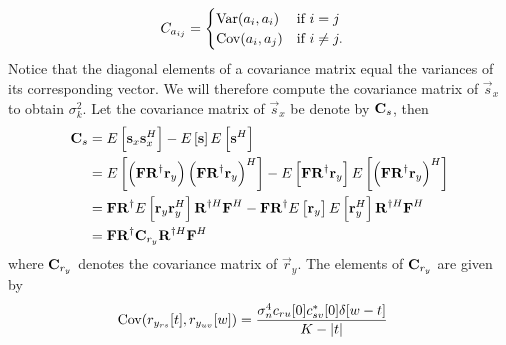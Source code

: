 \documentclass[a4paper, openany, oneside]{memoir}
\begin{document}
\begin{align}\label{eq:elem_cov_mat}
C_{a_{ij}}&= \begin{cases}
\operatorname{Var}(a_i, a_i) & \text{if } i=j\\
\operatorname{Cov} (a_i, a_j) & \text{if } i\neq j.
\end{cases}
\end{align}
Notice that the diagonal elements of a covariance matrix equal the variances of its corresponding vector. We will therefore compute the covariance matrix of $\vec{s}_x$ to obtain $\sigma_k^2$. Let the covariance matrix of $\vec{s}_x$ be denote by $\boldsymbol{\mathbf{C}}_s$, then
\begin{align*}
\boldsymbol{\mathbf{C}}_{s} &= E\left[\boldsymbol{\mathbf{s}}_x\boldsymbol{\mathbf{s}}_x^H\right] - E\left[\boldsymbol{\mathbf{s}}\right]E\left[\boldsymbol{\mathbf{s}}^H\right] \\
&= E\left[\left(\boldsymbol{\mathbf{F}} \boldsymbol{\mathbf{R}}^{\dagger}\boldsymbol{\mathbf{r}}_y\right) \left( \boldsymbol{\mathbf{F}}\boldsymbol{\mathbf{R}}^{\dagger}\boldsymbol{\mathbf{r}}_y\right)^H\right] - E\left[\boldsymbol{\mathbf{F}}\boldsymbol{\mathbf{R}}^{\dagger}\boldsymbol{\mathbf{r}}_y\right]E\left[\left(\boldsymbol{\mathbf{F}}\boldsymbol{\mathbf{R}}^{\dagger}\boldsymbol{\mathbf{r}}_y\right)^H\right] \\
&= \boldsymbol{\mathbf{F}}\boldsymbol{\mathbf{R}}^{\dagger} E\left[ \boldsymbol{\mathbf{r}}_y\boldsymbol{\mathbf{r}}_y^H\right]  \boldsymbol{\mathbf{R}}^{\dagger H}\boldsymbol{\mathbf{F}}^H -  \boldsymbol{\mathbf{F}}\boldsymbol{\mathbf{R}}^{\dagger} E\left[ \boldsymbol{\mathbf{r}}_y\right] E\left[\boldsymbol{\mathbf{r}}_y^H\right]   \boldsymbol{\mathbf{R}}^{\dagger H}\boldsymbol{\mathbf{F}}^H \\
&= \boldsymbol{\mathbf{F}}\boldsymbol{\mathbf{R}}^{\dagger} \boldsymbol{\mathbf{C}}_{r_y} \boldsymbol{\mathbf{R}}^{\dagger H}\boldsymbol{\mathbf{F}}^H
\end{align*}
where $\boldsymbol{\mathbf{C}}_{r_y}$ denotes the covariance matrix of $\vec{r}_y$. The elements of $\boldsymbol{\mathbf{C}}_{r_y}$ are given by\cite{ariananda2012compressive}
\begin{align}\label{eq:elem_cov_ry}
	\operatorname{Cov}(r_{y_{rs}}[t], r_{y_{uv}}[w]) &= \frac{\sigma_n^4 c_{ru}[0]c^*_{sv}[0]\delta[w-t]}{K-|t|}
\end{align}







\end{document}
